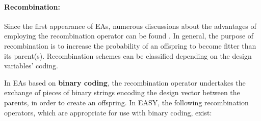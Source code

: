 \paragraph{Recombination:}
\label{RecombinationLabel}
Since the first appearance of EAs, numerous discussions about the advantages of employing the recombination operator can be found \cite{Schaffer87,Schaffer91,Navy92crossoveror}. In general, the purpose of recombination is to increase the probability of an offspring to become fitter than its parent(s). Recombination schemes can be classified depending on the design variables' coding. 

In EAs based on {\bf binary coding}, the recombination operator undertakes the exchange of pieces of binary strings encoding the design vector between the parents, in order to create an offspring. In EASY, the following recombination operators, which are appropriate for use with binary coding, exist:
